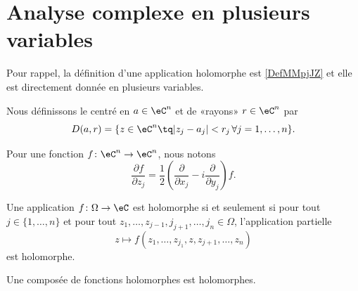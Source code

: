 

\section{Analyse complexe en plusieurs variables}

Pour rappel, la définition d'une application holomorphe est \ref{DefMMpjJZ} et elle est directement donnée en plusieurs variables.

\begin{definition}
	Nous définissons le  centré en \( a\in \eC^n\) et de «rayons» \( r\in \eC^n\) par
	\begin{equation}
		D(a,r)=\{ z\in \eC^n\tq | z_j-a_j |<r_j\,\forall j=1,\ldots, n \}.
	\end{equation}
\end{definition}

\begin{definition}
	Pour une fonction \( f\colon \eC^n\to \eC^n\), nous notons
	\begin{equation}
		\frac{ \partial f }{ \partial z_j }=\frac{ 1 }{2}\left( \frac{ \partial  }{ \partial x_j }-i\frac{ \partial  }{ \partial y_j } \right)f.
	\end{equation}
\end{definition}

\begin{proposition}	\label{PROPooKGOIooWRIoAq}
	Une application \(f \colon \Omega\to \eC  \) est holomorphe si et seulement si pour tout \( j\in\{ 1,\ldots,n \}\) et pour tout \( z_1,\ldots,z_{j-1}, j_{j+1},\ldots,j_n\in \Omega\), l'application partielle
	\begin{equation}
		z\mapsto f(z_1,\ldots,z_{j_1}, z,z_{j+1},\ldots,z_n)
	\end{equation}
	est holomorphe.
\end{proposition}

\begin{proposition}	\label{PROPooFTXYooBMVlSS}
	Une composée de fonctions holomorphes est holomorphes.
\end{proposition}



